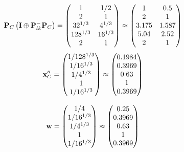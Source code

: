 \documentclass[10pt,a4paper]{article}
\begin{document}
	\[
		\bold{P}_{C}\left(\bold{I} \oplus \bold{P}_{lk}^{-}\bold{P}_{C}\right) = 
		\begin{pmatrix}
			{1}{} & {1} / {{2}} \\
			{{2}}{} & {1}{} \\
			{{32^ {1 / 3}}}{} & {{4^ {1 / 3}}}{} \\
			{{128^ {1 / 3}}}{} & {{16^ {1 / 3}}}{} \\
			{{2}}{} & {1}{} \\
		\end{pmatrix}
		\approx
		\begin{pmatrix}
			1        & 0.5      \\
			2        & 1        \\
			3.175    & 1.587    \\
			5.04     & 2.52     \\
			2        & 1        \\
		\end{pmatrix}
	\]
	\[
		\bold{x}''_{C} = 
		\begin{pmatrix}
			{1} / {{128^ {1 / 3}}} \\
			{1} / {{16^ {1 / 3}}} \\
			{1} / {{4^ {1 / 3}}} \\
			{1}{} \\
			{1} / {{16^ {1 / 3}}} \\
		\end{pmatrix}
		\approx
		\begin{pmatrix}
			0.1984   \\
			0.3969   \\
			0.63     \\
			1        \\
			0.3969   \\
		\end{pmatrix}
	\]

	\[
		\bold{w} = 
		\begin{pmatrix}
			{1} / {{4}} \\
			{1} / {{16^ {1 / 3}}} \\
			{1} / {{4^ {1 / 3}}} \\
			{1}{} \\
			{1} / {{16^ {1 / 3}}} \\
		\end{pmatrix}
		\approx
		\begin{pmatrix}
			0.25     \\
			0.3969   \\
			0.63     \\
			1        \\
			0.3969   \\
		\end{pmatrix}
	\]
\end{document}
